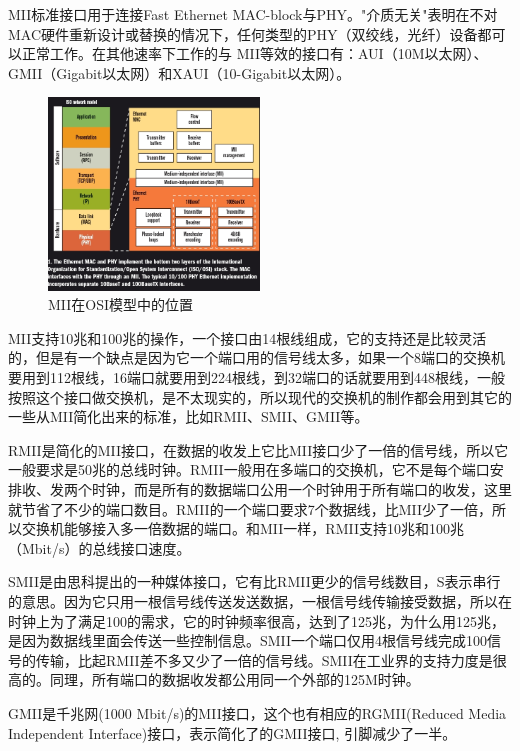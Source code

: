 MII标准接口用于连接Fast Ethernet MAC-block与PHY。"介质无关"表明在不对MAC硬件重新设计或替换的情况下，任何类型的PHY（双绞线，光纤）设备都可以正常工作。在其他速率下工作的与 MII等效的接口有：AUI（10M以太网）、GMII（Gigabit以太网）和XAUI（10-Gigabit以太网）。

\begin{figure}[ht]
	\begin{center}
		\includegraphics[keepaspectratio,width=0.5\textwidth]{Hardwares/MII.jpg}
	\caption{MII在OSI模型中的位置}
	\label{figOsiMii}
	\end{center}
\end{figure}



MII支持10兆和100兆的操作，一个接口由14根线组成，它的支持还是比较灵活的，但是有一个缺点是因为它一个端口用的信号线太多，如果一个8端口的交换机要用到112根线，16端口就要用到224根线，到32端口的话就要用到448根线，一般按照这个接口做交换机，是不太现实的，所以现代的交换机的制作都会用到其它的一些从MII简化出来的标准，比如RMII、SMII、GMII等。

RMII是简化的MII接口，在数据的收发上它比MII接口少了一倍的信号线，所以它一般要求是50兆的总线时钟。RMII一般用在多端口的交换机，它不是每个端口安排收、发两个时钟，而是所有的数据端口公用一个时钟用于所有端口的收发，这里就节省了不少的端口数目。RMII的一个端口要求7个数据线，比MII少了一倍，所以交换机能够接入多一倍数据的端口。和MII一样，RMII支持10兆和100兆（Mbit/s）的总线接口速度。

SMII是由思科提出的一种媒体接口，它有比RMII更少的信号线数目，S表示串行的意思。因为它只用一根信号线传送发送数据，一根信号线传输接受数据，所以在时钟上为了满足100的需求，它的时钟频率很高，达到了125兆，为什么用125兆，是因为数据线里面会传送一些控制信息。SMII一个端口仅用4根信号线完成100信号的传输，比起RMII差不多又少了一倍的信号线。SMII在工业界的支持力度是很高的。同理，所有端口的数据收发都公用同一个外部的125M时钟。

GMII是千兆网(1000 Mbit/s)的MII接口，这个也有相应的RGMII(Reduced Media Independent Interface)接口，表示简化了的GMII接口, 引脚减少了一半。

